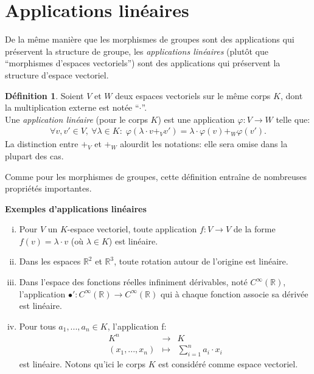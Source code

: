 \documentclass[oneside,12pt,french,table]{book}
\newcommand{\R}{\mathbb{R}}
\theoremstyle{definition}
\theoremstyle{definition}
\theoremstyle{definition}
\newtheorem{definition}{Définition}[chapter]
\begin{document}
\section {Applications linéaires}
\noindent De la même manière que les morphismes de groupes sont des applications qui préservent la structure de groupe, les \textit{applications linéaires} (plutôt que ``morphismes d'espaces vectoriels'') sont des applications qui préservent la structure d'espace vectoriel.
\begin{definition}
Soient $V$ et $W$ deux espaces vectoriels sur le même corps $K$, dont la multiplication externe est notée ``$\cdot$''. \\
Une \textit{application linéaire} (pour le corps $K$) est une application $\varphi : V \longrightarrow W$ telle que:
\begin{align*}
    \forall v,v' \in V, \: \forall \lambda \in K : \; \varphi(\lambda \cdot v +_V v') = \lambda \cdot \varphi(v) +_W \varphi(v').
\end{align*}
La distinction entre $+_V$ et $+_W$ alourdit les notations: elle sera omise dans la plupart des cas.

\noindent
Comme pour les morphismes de groupes, cette définition entraîne de nombreuses propriétés importantes.
\end{definition}
\noindent\textbf{Exemples d'applications linéaires}
        \begin{enumerate}[(i)]
            \item Pour $V$ un $K$-espace vectoriel, toute application $f:V \longrightarrow V$ de la forme $f(v) = \lambda \cdot v$ (où $\lambda \in K$) est linéaire.
            \item Dans les espaces $\R^2$ et $\R^3$, toute rotation autour de l'origine est linéaire. 
            \item Dans l'espace des fonctions réelles infiniment dérivables, noté $C^\infty(\R)$, l'application $\bullet' : C^\infty(\R) \longrightarrow C^\infty(\R)$ qui à chaque fonction associe sa dérivée est linéaire.
            \item Pour tous $a_1,...,a_n \in K$, l'application
            f: $$\begin{array}{rcl}
                K^n &\longrightarrow& K \\
                 (x_1,...,x_n) &\longmapsto& \sum_{i=1}^n a_i \cdot x_i 
            \end{array}$$ est linéaire. Notons qu'ici le corps $K$ est considéré comme espace vectoriel.
        \end{enumerate}
\end{document}
